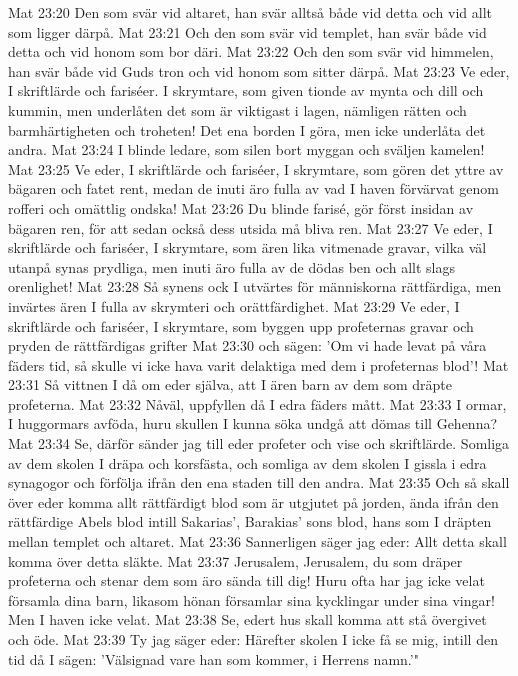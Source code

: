 Mat 23:20  Den som svär vid altaret, han svär alltså både vid detta och vid allt som ligger därpå.
Mat 23:21  Och den som svär vid templet, han svär både vid detta och vid honom som bor däri.
Mat 23:22  Och den som svär vid himmelen, han svär både vid Guds tron och vid honom som sitter därpå.
Mat 23:23  Ve eder, I skriftlärde och fariséer. I skrymtare, som given tionde av mynta och dill och kummin, men underlåten det som är viktigast i lagen, nämligen rätten och barmhärtigheten och troheten! Det ena borden I göra, men icke underlåta det andra.
Mat 23:24  I blinde ledare, som silen bort myggan och sväljen kamelen!
Mat 23:25  Ve eder, I skriftlärde och fariséer, I skrymtare, som gören det yttre av bägaren och fatet rent, medan de inuti äro fulla av vad I haven förvärvat genom rofferi och omättlig ondska!
Mat 23:26  Du blinde farisé, gör först insidan av bägaren ren, för att sedan också dess utsida må bliva ren.
Mat 23:27  Ve eder, I skriftlärde och fariséer, I skrymtare, som ären lika vitmenade gravar, vilka väl utanpå synas prydliga, men inuti äro fulla av de dödas ben och allt slags orenlighet!
Mat 23:28  Så synens ock I utvärtes för människorna rättfärdiga, men invärtes ären I fulla av skrymteri och orättfärdighet.
Mat 23:29  Ve eder, I skriftlärde och fariséer, I skrymtare, som byggen upp profeternas gravar och pryden de rättfärdigas grifter
Mat 23:30  och sägen: 'Om vi hade levat på våra fäders tid, så skulle vi icke hava varit delaktiga med dem i profeternas blod'!
Mat 23:31  Så vittnen I då om eder själva, att I ären barn av dem som dräpte profeterna.
Mat 23:32  Nåväl, uppfyllen då I edra fäders mått.
Mat 23:33  I ormar, I huggormars avföda, huru skullen I kunna söka undgå att dömas till Gehenna?
Mat 23:34  Se, därför sänder jag till eder profeter och vise och skriftlärde. Somliga av dem skolen I dräpa och korsfästa, och somliga av dem skolen I gissla i edra synagogor och förfölja ifrån den ena staden till den andra.
Mat 23:35  Och så skall över eder komma allt rättfärdigt blod som är utgjutet på jorden, ända ifrån den rättfärdige Abels blod intill Sakarias', Barakias' sons blod, hans som I dräpten mellan templet och altaret.
Mat 23:36  Sannerligen säger jag eder: Allt detta skall komma över detta släkte.
Mat 23:37  Jerusalem, Jerusalem, du som dräper profeterna och stenar dem som äro sända till dig! Huru ofta har jag icke velat församla dina barn, likasom hönan församlar sina kycklingar under sina vingar! Men I haven icke velat.
Mat 23:38  Se, edert hus skall komma att stå övergivet och öde.
Mat 23:39  Ty jag säger eder: Härefter skolen I icke få se mig, intill den tid då I sägen: 'Välsignad vare han som kommer, i Herrens namn.'"
